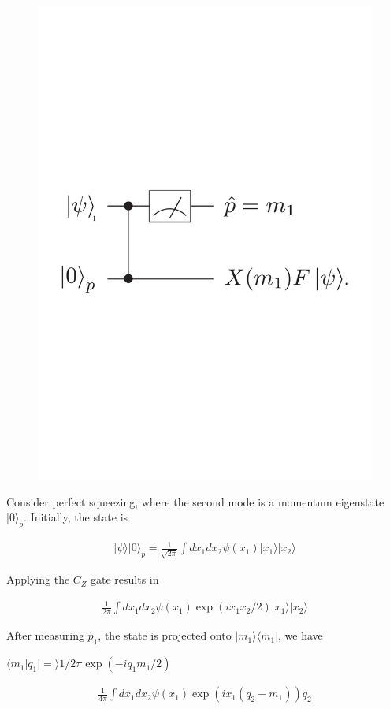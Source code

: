 \documentclass[reprint,
superscriptaddress,
 amsmath,amssymb,
 aps,
prb,
]{revtex4-1}
\newcommand{\bra}[1]{\langle{#1}|}
\newcommand{\ket}[1]{|{#1}\rangle}
\newcommand{\braket}[2]{\langle{#1}|{#2}\rangle}
\begin{document}
\begin{figure}
\includegraphics[trim = 0cm 10cm 0cm 10cm, clip, width=0.75\linewidth]{one_qubit_teleport.pdf}
\caption{\label{fig:cluster_Teleport}}
\end{figure}

 Consider perfect squeezing, where the second mode is a momentum eigenstate $\ket{0}_p$. Initially, the state is 


\begin{eqnarray}
\ket{\psi}\ket{0}_p = \frac{1}{\sqrt {2\pi}} \int dx_1 dx_2 \psi(x_1)\ket{x_1}\ket{x_2}
\end{eqnarray} 

Applying the $C_Z$ gate results in


\begin{eqnarray}
\frac{1}{2\pi} \int dx_1 dx_2 \psi(x_1) \exp(i x_1 x_2/2)\ket{x_1}\ket{x_2}
\end{eqnarray}

After measuring $\hat p_1$, the state is projected onto $\ket{m_1}\bra{m_1}$, we have

$\braket{m_1|q_1}= 1/2\pi \exp(-iq_1 m_1/2)$


\begin{eqnarray}
\frac{1}{4\pi}\int d x_1 d x_2 \psi(x_1) \exp(i x_1 (q_2 - m_1)) q_2
 \end{eqnarray}
 
\end{document}
